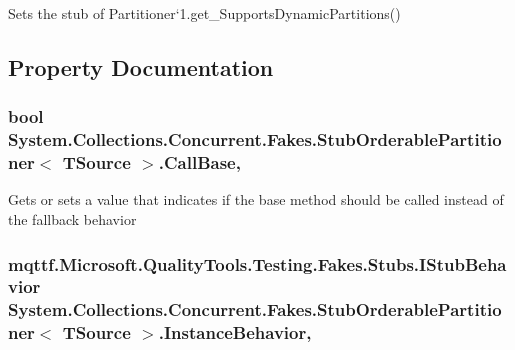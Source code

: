 Sets the stub of Partitioner`1.get\-\_\-\-Supports\-Dynamic\-Partitions()



\subsection{Property Documentation}
\hypertarget{class_system_1_1_collections_1_1_concurrent_1_1_fakes_1_1_stub_orderable_partitioner_3_01_t_source_01_4_a78baec7894ceb1aafd6ec6c30e1ad1c7}{
\subsubsection[{Call\-Base}]{\setlength{\rightskip}{0pt plus 5cm}bool System.\-Collections.\-Concurrent.\-Fakes.\-Stub\-Orderable\-Partitioner$<$ T\-Source $>$.Call\-Base\hspace{0.3cm}{\ttfamily [get]}, {\ttfamily [set]}}}\label{class_system_1_1_collections_1_1_concurrent_1_1_fakes_1_1_stub_orderable_partitioner_3_01_t_source_01_4_a78baec7894ceb1aafd6ec6c30e1ad1c7}


Gets or sets a value that indicates if the base method should be called instead of the fallback behavior

\hypertarget{class_system_1_1_collections_1_1_concurrent_1_1_fakes_1_1_stub_orderable_partitioner_3_01_t_source_01_4_ac4ef6022e771d5995e032fe1bdcc9e52}{
\subsubsection[{Instance\-Behavior}]{\setlength{\rightskip}{0pt plus 5cm}mqttf.\-Microsoft.\-Quality\-Tools.\-Testing.\-Fakes.\-Stubs.\-I\-Stub\-Behavior System.\-Collections.\-Concurrent.\-Fakes.\-Stub\-Orderable\-Partitioner$<$ T\-Source $>$.Instance\-Behavior\hspace{0.3cm}{\ttfamily [get]}, {\ttfamily [set]}}}\label{class_system_1_1_collections_1_1_concurrent_1_1_fakes_1_1_stub_orderable_partitioner_3_01_t_source_01_4_ac4ef6022e771d5995e032fe1bdcc9e52}


